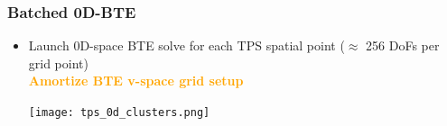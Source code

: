 \documentclass[mathserif, aspectratio=169]{beamer}
\newcommand{\vect}[1]{\boldsymbol{#1}}
\begin{document}
\begin{frame}
	\frametitle{Batched 0D-BTE}
	\begin{itemize}
		\item Launch 0D-space BTE solve for each TPS spatial point ($\approx$ 256 DoFs per grid point)\\
		\textbf{\textcolor{orange}{Amortize BTE v-space grid setup} }
	\begin{center}
		\texttt{[image: tps\_0d\_clusters.png]}
			



\end{center}
\end{itemize}
\end{frame}
\end{document}
